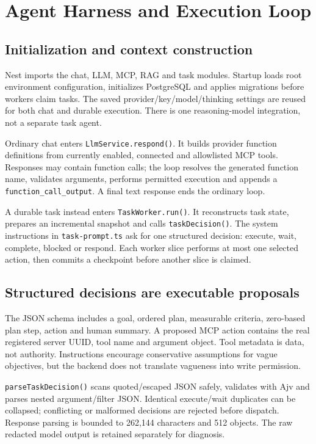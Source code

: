 \chapter{Agent Harness and Execution Loop}
\section{Initialization and context construction}
Nest imports the chat, LLM, MCP, RAG and task modules. Startup loads root environment configuration, initializes PostgreSQL and applies migrations before workers claim tasks. The saved provider/key/model/thinking settings are reused for both chat and durable execution. There is one reasoning-model integration, not a separate task agent.

Ordinary chat enters \texttt{LlmService.respond()}. It builds provider function definitions from currently enabled, connected and allowlisted MCP tools. Responses may contain function calls; the loop resolves the generated function name, validates arguments, performs permitted execution and appends a \texttt{function\_call\_output}. A final text response ends the ordinary loop.

A durable task instead enters \texttt{TaskWorker.run()}. It reconstructs task state, prepares an incremental snapshot and calls \texttt{taskDecision()}. The system instructions in \texttt{task-prompt.ts} ask for one structured decision: execute, wait, complete, blocked or respond. Each worker slice performs at most one selected action, then commits a checkpoint before another slice is claimed.
\begin{center}\end{center}
\section{Structured decisions are executable proposals}
The JSON schema includes a goal, ordered plan, measurable criteria, zero-based plan step, action and human summary. A proposed MCP action contains the real registered server UUID, tool name and argument object. Tool metadata is data, not authority. Instructions encourage conservative assumptions for vague objectives, but the backend does not translate vagueness into write permission.

\texttt{parseTaskDecision()} scans quoted/escaped JSON safely, validates with Ajv and parses nested argument/filter JSON. Identical execute/wait duplicates can be collapsed; conflicting or malformed decisions are rejected before dispatch. Response parsing is bounded to 262,144 characters and 512 objects. The raw redacted model output is retained separately for diagnosis.
